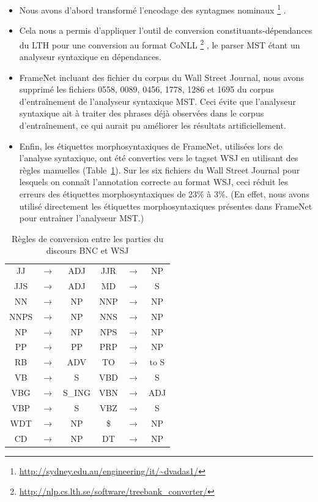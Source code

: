 \begin{itemize}
    \item Nous avons d'abord transformé l'encodage des syntagmes nominaux
        \footnote{\url{http://sydney.edu.au/engineering/it/~dvadas1/}}
        \citep{vadas2007adding}.
    \item Cela nous a permis d'appliquer l'outil de conversion
        constituants-dépendances du LTH pour une conversion au format CoNLL
        \footnote{\url{http://nlp.cs.lth.se/software/treebank_converter/}}
        \citep{johansson2007extended}, le parser MST étant un analyseur
        syntaxique en dépendances.
    \item FrameNet incluant des fichier du corpus du Wall Street
        Journal, nous avons supprimé les fichiers 0558, 0089, 0456, 1778, 1286
        et 1695 du corpus d'entraînement de l'analyseur syntaxique MST. Ceci
        évite que l'analyseur syntaxique ait à traiter des phrases déjà
        observées dans le corpus d'entraînement, ce qui aurait pu améliorer les
        résultats artificiellement.
    \item Enfin, les étiquettes morphosyntaxiques de FrameNet, utilisées lors
        de l'analyse syntaxique, ont été converties vers le tagset WSJ en
        utilisant des règles manuelles (Table~\ref{table:tagset_rules}). Sur
        les six fichiers du Wall Street Journal pour lesquels on connaît
        l'annotation correcte au format WSJ, ceci réduit les erreurs des
        étiquettes morphosyntaxiques de 23\% à 3\%.  (En effet, nous avons
        utilisé directement les étiquettes morphosyntaxiques présentes dans
        FrameNet pour entraîner l'analyseur MST.)
\end{itemize}

\begin{table}[ht]
    \centering
    \begin{tabular}{ccc|ccc}
        \toprule
        JJ   &$\to$& ADJ    & JJR  &$\to$& NP     \\
        JJS  &$\to$& ADJ    & MD   &$\to$& S      \\
        NN   &$\to$& NP     & NNP  &$\to$& NP     \\
        NNPS &$\to$& NP     & NNS  &$\to$& NP     \\
        NP   &$\to$& NP     & NPS  &$\to$& NP     \\
        PP   &$\to$& PP     & PRP  &$\to$& NP     \\  
        RB   &$\to$& ADV    & TO   &$\to$& to S   \\
        VB   &$\to$& S      & VBD  &$\to$& S      \\
        VBG  &$\to$& S\_ING & VBN  &$\to$& ADJ    \\
        VBP  &$\to$& S      & VBZ  &$\to$& S      \\
        WDT  &$\to$& NP     & \$   &$\to$& NP     \\  
        CD   &$\to$& NP     & DT   &$\to$& NP     \\
        \bottomrule
    \end{tabular}
    \caption{\label{table:tagset_rules}Règles de conversion entre les parties du discours BNC et WSJ}
\end{table}

